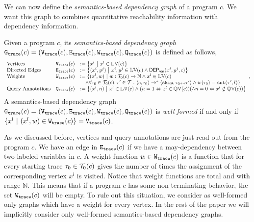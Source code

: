 We can now define the \emph{semantics-based dependency graph} of a program $c$. We want this graph to combines quantitative reachability information with dependency information. 
\begin{defn}
\label{def:trace_graph}
Given a program ${c}$,
its \emph{semantics-based dependency graph} 
$\mathtt{{G_{trace}}}({c}) = (\mathtt{{V_{trace}}}({c}), \mathtt{{E_{trace}}}({c}), \mathtt{{W_{trace}}}({c}), \mathtt{{Q_{trace}}}({c}))$ is defined as follows,
{\small
\[
\begin{array}{lll}
  \text{Vertices} &
  \traceV({c}) & := \left\{ 
  x^l
  ~ \middle\vert ~ x^l \in \lvar(c)
  \right\}
  \\
  \text{Directed Edges} &
  \traceE({c}) & := 
  \left\{ 
  (x^i, y^j) 
  ~ \middle\vert ~
  x^i, y^j \in \lvar(c) \land \vardep(x^i, y^j, c) 
  \right\}
  \\
  \text{Weights} &
  \traceW({c}) & := 
  \{ 
  (x^l, w) 
  ~ \vert ~ 
  w : \mathcal{T}_0(c) \to \mathbb{N}
  \land
  x^l \in \lvar(c) 
  \\ & &
  \quad \land
  \forall \trace_0 \in \mathcal{T}_0(c), \trace' \in \mathcal{T} \st \config{{c}, \trace_0} \to^{*} \config{\eskip, \trace_0\tracecat\trace'} 
  \land w(\trace_0) = \vcounter(\trace', l) \}
  \\
  \text{Query Annotations} &
  \traceF({c}) & := 
\left\{(x^l, n)  
~ \middle\vert ~
 x^l \in \lvar(c) \land
(n = 1 \Leftrightarrow x^l \in \qvar(c)) (\land n = 0 \Leftrightarrow  x^l \notin \qvar(c))
\right\}
\end{array},
\]
A semantics-based dependency graph $\mathtt{{G_{trace}}}({c})= (\mathtt{{V_{trace}}}({c}), \mathtt{{E_{trace}}}({c}), \mathtt{{W_{trace}}}({c}), \mathtt{{Q_{trace}}}({c}))$ is \emph{well-formed} if and only if $ \{x^l \ |\ (x^l,w)\in \mathtt{{W_{trace}}}({c})\} = \mathtt{{V_{trace}}}({c}) $.
}
\end{defn}
As we discussed before, vertices and query annotations are just read out from the program $c$. We have an edge in $\mathtt{{E_{trace}}}(c)$ if we have a may-dependency between two labeled variables in $c$.
A weight function $w \in \mathtt{{W_{trace}}}(c)$ is a function that for every starting trace $\mathtt{\tau}_0 \in \mathcal{T}_0(c)$ 
gives the number of times the assignment of the corresponding vertex $x^l$ is visited. Notice that weight functions are total and with range $\mathbb{N}$. This means that if a program $c$ has some non-terminating behavior, the set $\mathtt{{W_{trace}}}(c)$ will be empty. 
To rule out this situation, we consider as well-formed only graphs which have a weight for every vertex. 
In the rest of the paper we will implicitly consider only well-formed semantics-based dependency graphs. 

